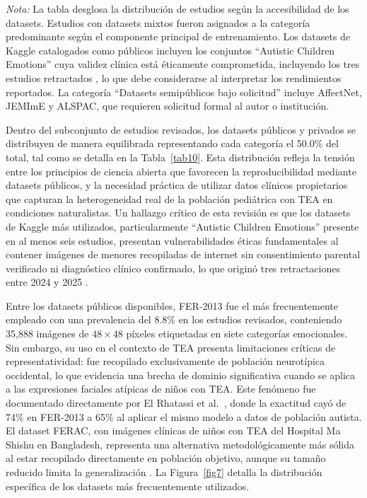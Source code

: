 \documentclass[ASNA,twocolumn]{USG}
\begin{document}
\begin{table}[!ht]
		\begin{tablenotes}
			\item {\it Nota:} La tabla desglosa la distribución de estudios según la
			accesibilidad de los datasets. Estudios con datasets mixtos fueron asignados a la
			categoría predominante según el componente principal de entrenamiento. Los datasets
			de Kaggle catalogados como públicos incluyen los conjuntos ``Autistic Children
			Emotions'' cuya validez clínica está éticamente comprometida, incluyendo los tres
			estudios retractados \cite{Gungor2025,Mahmood2025,Kumar2024}, lo que debe
			considerarse al interpretar los rendimientos reportados. La categoría ``Datasets
			semipúblicos bajo solicitud'' incluye AffectNet, JEMImE y ALSPAC, que requieren
			solicitud formal al autor o institución.
		\end{tablenotes}
	\end{table}
	
	Dentro del subconjunto de estudios revisados, los datasets públicos y privados se
	distribuyen de manera equilibrada representando cada categoría el 50.0\% del total,
	tal como se detalla en la Tabla~\ref{tab10}. Esta distribución refleja la tensión
	entre los principios de ciencia abierta que favorecen la reproducibilidad mediante
	datasets públicos, y la necesidad práctica de utilizar datos clínicos propietarios
	que capturan la heterogeneidad real de la población pediátrica con TEA en
	condiciones naturalistas. Un hallazgo crítico de esta revisión es que los datasets
	de Kaggle más utilizados, particularmente ``Autistic Children Emotions'' presente
	en al menos seis estudios, presentan vulnerabilidades éticas fundamentales al
	contener imágenes de menores recopiladas de internet sin consentimiento parental
	verificado ni diagnóstico clínico confirmado, lo que originó tres retractaciones
	entre 2024 y 2025 \cite{Gungor2025,Mahmood2025,Kumar2024}.
	
	Entre los datasets públicos disponibles, FER-2013 fue el más frecuentemente
	empleado con una prevalencia del 8.8\% en los estudios revisados, conteniendo
	35{,}888 imágenes de $48\times48$ píxeles etiquetadas en siete categorías
	emocionales. Sin embargo, su uso en el contexto de TEA presenta limitaciones
	críticas de representatividad: fue recopilado exclusivamente de población
	neurotípica occidental, lo que evidencia una brecha de dominio significativa cuando
	se aplica a las expresiones faciales atípicas de niños con TEA. Este fenómeno fue
	documentado directamente por El Rhatassi et al.\ \cite{Rhatassi2024}, donde la
	exactitud cayó de 74\% en FER-2013 a 65\% al aplicar el mismo modelo a datos de
	población autista. El dataset FERAC, con imágenes clínicas de niños con TEA del
	Hospital Ma Shishu en Bangladesh, representa una alternativa metodológicamente más
	sólida al estar recopilado directamente en población objetivo, aunque su tamaño
	reducido limita la generalización \cite{Radocaj2025}. La Figura~\ref{fig7} detalla
	la distribución específica de los datasets más frecuentemente utilizados.
	
\end{document}
